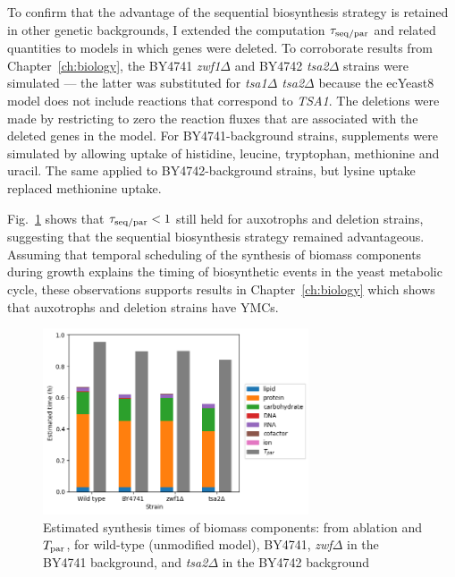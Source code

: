 To confirm that the advantage of the sequential biosynthesis strategy is retained in other genetic backgrounds, I extended the computation $\tau_{\mathrm{seq}/\mathrm{par}}$ and related quantities to models in which genes were deleted.
To corroborate results from Chapter~\ref{ch:biology}, the BY4741 \textit{zwf1$\Delta$} and BY4742 \textit{tsa2$\Delta$} strains were simulated --- the latter was substituted for \textit{tsa1$\Delta$ tsa2$\Delta$} because the ecYeast8 model does not include reactions that correspond to \textit{TSA1}.
The deletions were made by restricting to zero the reaction fluxes that are associated with the deleted genes in the model.
For BY4741-background strains, supplements were simulated by allowing uptake of histidine, leucine, tryptophan, methionine and uracil.
The same applied to BY4742-background strains, but lysine uptake replaced methionine uptake.

Fig.\ \ref{fig:model-ablation-strains} shows that $\tau_{\mathrm{seq}/\mathrm{par}} < 1$ still held for auxotrophs and deletion strains, suggesting that the sequential biosynthesis strategy remained advantageous.
Assuming that temporal scheduling of the synthesis of biomass components during growth explains the timing of biosynthetic events in the yeast metabolic cycle, these observations supports results in Chapter~\ref{ch:biology} which shows that auxotrophs and deletion strains have YMCs.

\begin{figure}[hb!]
  \centering
  \includegraphics[width=0.7\textwidth]{deletions}

  \caption[
    Estimated synthesis times of biomass components, for BY4741, \textit{zwf$\Delta$}, and \textit{tsa2$\Delta$}
  ]{
    Estimated synthesis times of biomass components: from ablation and $T_{\mathrm{par}}$, for wild-type (unmodified model), BY4741, \textit{zwf$\Delta$} in the BY4741 background, and \textit{tsa2$\Delta$} in the BY4742 background
  }
  \label{fig:model-ablation-strains}
\end{figure}


